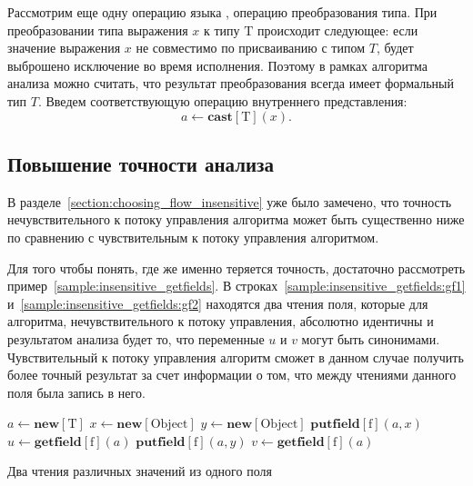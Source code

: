 \documentclass[14pt,titlepage,draft]{extarticle}
\newcommand{\java}{\eng{Java}\xspace}
\newcommand{\type}[1]{\mathrm{#1}}
\newcommand{\field}[1]{\mathrm{#1}}
\newcommand{\op}[1]{\mathbf{#1}}
\begin{document}
    Рассмотрим еще одну операцию языка \java, операцию преобразования типа. При
    преобразовании типа выражения $x$ к типу $\type{T}$ происходит следующее:
    если значение выражения $x$ не совместимо по присваиванию с типом $T$,
    будет выброшено исключение во время исполнения.
    Поэтому в рамках алгоритма анализа можно считать, что результат
    преобразования всегда имеет формальный тип $T$.
    Введем соответствующую операцию внутреннего представления:
    \[ a \gets \op{cast}[\type{T}](x). \]

  \subsection{Повышение точности анализа}
    \label{section:increase_accuracy}

    В разделе~\ref{section:choosing_flow_insensitive} уже было замечено, что
    точность нечувствительного к потоку управления алгоритма может быть
    существенно ниже по сравнению с чувствительным к потоку управления
    алгоритмом.

    Для того чтобы понять, где же именно теряется точность, достаточно
    рассмотреть пример~\ref{sample:insensitive_getfields}. В
    строках~\ref{sample:insensitive_getfields:gf1}
    и~\ref{sample:insensitive_getfields:gf2} находятся два чтения поля, которые
    для алгоритма, нечувствительного к потоку управления, абсолютно идентичны и
    результатом анализа будет то, что переменные $u$ и $v$ могут быть
    синонимами. Чувствительный к потоку управления алгоритм сможет в данном
    случае получить более точный результат за счет информации о том, что между
    чтениями данного поля была запись в него.

    \begin{sample}
      \begin{algorithmic}[1]
        \State $a \gets \op{new}[\type{T}]$
        \State $x \gets \op{new}[\type{Object}]$
        \State $y \gets \op{new}[\type{Object}]$
        \State $\op{putfield}[\field{f}](a, x)$
        \State $u \gets \op{getfield}[\field{f}](a)$
          \label{sample:insensitive_getfields:gf1}
        \State $\op{putfield}[\field{f}](a, y)$
        \State $v \gets \op{getfield}[\field{f}](a)$
          \label{sample:insensitive_getfields:gf2}
      \end{algorithmic}
      \caption{Два чтения различных значений из одного поля}
      \label{sample:insensitive_getfields}
    \end{sample}
\end{document}
